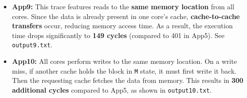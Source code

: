 \documentclass{article}
\begin{document}
\begin{itemize}
    \item \textbf{App9:} This trace features reads to the \textbf{same memory location} from all cores. Since the data is already present in one core’s cache, \textbf{cache-to-cache transfers} occur, reducing memory access time. As a result, the execution time drops significantly to \textbf{149 cycles} (compared to 401 in App5). See \texttt{output9.txt}.

    \item \textbf{App10:} All cores perform writes to the same memory location. On a write miss, if another cache holds the block in \texttt{M} state, it must first write it back. Then the requesting cache fetches the data from memory. This results in \textbf{300 additional cycles} compared to App5, as shown in \texttt{output10.txt}.
\end{itemize}
\end{document}
